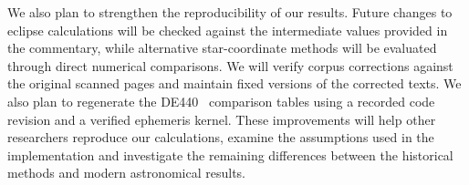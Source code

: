 \documentclass[12pt,a4paper,oneside]{report}
\begin{document}
We also plan to strengthen the reproducibility of our results. Future changes to eclipse calculations will be checked against the intermediate values provided in the commentary, while alternative star-coordinate methods will be evaluated through direct numerical comparisons. We will verify corpus corrections against the original scanned pages and maintain fixed versions of the corrected texts. We also plan to regenerate the DE440~\cite{Park2021DE440} comparison tables using a recorded code revision and a verified ephemeris kernel. These improvements will help other researchers reproduce our calculations, examine the assumptions used in the implementation and investigate the remaining differences between the historical methods and modern astronomical results.

\cleardoublepage
{}
{}
\renewcommand{\bibname}{References}
\nocite{pyswisseph}


\end{document}
